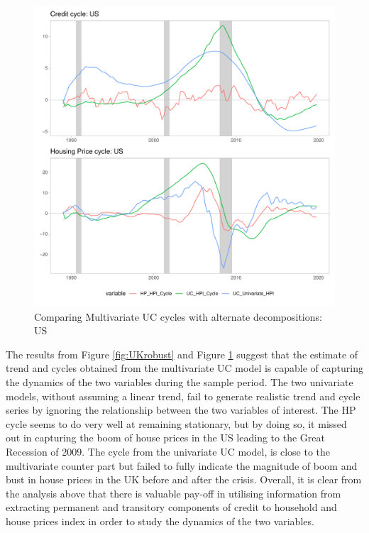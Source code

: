 \documentclass[
  12pt,
]{article}
\begin{document}
\begin{figure}

{\centering \includegraphics[width=0.85\linewidth]{../../Regression/AR_2/Output/graphs/HP_Credit_2graphs_US} 

}

\caption{Comparing Multivariate UC cycles with alternate decompositions: US}\label{fig:USrobust}
\end{figure}

\newpage

The results from Figure \ref{fig:UKrobust} and Figure \ref{fig:USrobust} suggest that the estimate of trend and cycles obtained from the multivariate UC model is capable of capturing the dynamics of the two variables during the sample period. The two univariate models, without assuming a linear trend, fail to generate realistic trend and cycle series by ignoring the relationship between the two variables of interest. The HP cycle seems to do very well at remaining stationary, but by doing so, it missed out in capturing the boom of house prices in the US leading to the Great Recession of 2009. The cycle from the univariate UC model, is close to the multivariate counter part but failed to fully indicate the magnitude of boom and bust in house prices in the UK before and after the crisis. Overall, it is clear from the analysis above that there is valuable pay-off in utilising information from extracting permanent and transitory components of credit to household and house prices index in order to study the dynamics of the two variables.
\end{document}
